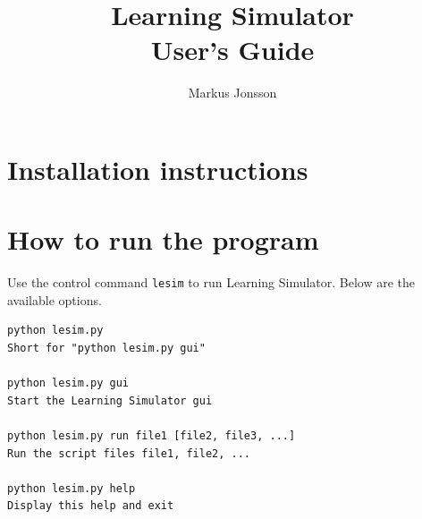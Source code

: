 \documentclass[11pt]{article}
\title{Learning Simulator \\ User's Guide}
\author{Markus Jonsson}
\newcommand{\cmd}[1]{\texttt{#1}}
\begin{document}
\maketitle

\section{Installation instructions}

\section{How to run the program}
Use the control command \cmd{lesim} to run Learning Simulator. Below are the available options.

\begin{lstlisting}[caption={\cmd{lesim} syntax \label{lst:lesim_command}}]
python lesim.py
Short for "python lesim.py gui"
    
python lesim.py gui
Start the Learning Simulator gui
    
python lesim.py run file1 [file2, file3, ...]
Run the script files file1, file2, ...

python lesim.py help
Display this help and exit
\end{lstlisting}
\end{document}
